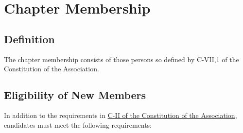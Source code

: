 \chapter{Chapter Membership}
\section{Definition} The chapter membership consists of those persons so defined by C-VII,1 of the Constitution of the Association.

\section{Eligibility of New Members}\label{by:elig}
In addition to the requirements in \href{http://www.tbp.org/off/ConstBylaw.pdf}{C-II of the Constitution of the Association}, candidates must meet the following requirements:
